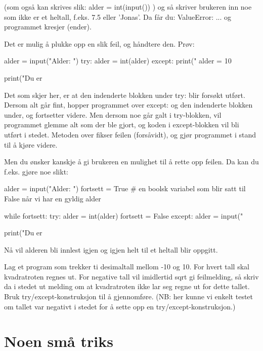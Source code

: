 (som også kan skrives slik: alder = int(input()) ) og så skriver brukeren inn noe som ikke er et heltall, f.eks. 7.5 eller 'Jonas'. Da får du: ValueError: ... og programmet kresjer (ender). 

Det er mulig å plukke opp en slik feil, og håndtere den. 
Prøv:
\begin{usncodebox}
alder = input("Alder: ")
try:
    alder = int(alder)
except:
    print("%
    alder = 10 

print("Du er %
\end{usncodebox}
    
Det som skjer her, er at den indenderte blokken under try: blir forsøkt utført. Dersom alt går fint, hopper programmet over except: og den indenderte blokken under, og fortsetter videre. Men dersom noe går galt i try-blokken, vil programmet glemme alt som der ble gjort, og koden i except-blokken vil bli utført i stedet. Metoden over fikser feilen (forsåvidt), og gjør programmet i stand til å kjøre videre. 

Men du ønsker kanskje å gi brukeren en mulighet til å rette opp feilen. Da kan du f.eks. gjøre noe slikt:

\begin{usncodebox}
alder = input("Alder: ")
fortsett = True     # en boolsk variabel som blir satt til False når vi har en gyldig alder

while fortsett: 
    try:
        alder = int(alder)
        fortsett = False
    except:
        alder = input("%

print("Du er %
\end{usncodebox}

Nå vil alderen bli innlest igjen og igjen helt til et heltall blir oppgitt. 

\begin{exercise}
Lag et program som trekker ti desimaltall mellom -10 og 10. For hvert tall skal kvadratroten regnes ut.
For negative tall vil imidlertid sqrt gi feilmelding, så skriv da i stedet ut melding om at kvadratroten ikke lar seg regne ut for dette tallet. Bruk try/except-konstruksjon til å gjennomføre. (NB: her kunne vi enkelt testet om tallet var negativt i stedet for å sette opp en try/except-konstruksjon.)
\end{exercise}

\section{Noen små triks}

